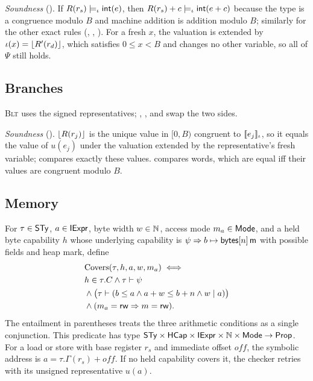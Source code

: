 \emph{Soundness} (). If $R(r_s)\models_\iota\mathsf{int}(e)$, then $R(r_s)+c\models_\iota\mathsf{int}(e+c)$ because the type is a congruence modulo $B$ and machine addition is addition modulo $B$; similarly for the other exact rules (, , ). For a fresh $x$, the valuation is extended by $\iota(x)=\lfloor R'(r_d)\rfloor$, which satisfies $0\le x<B$ and changes no other variable, so all of $\Psi$ still holds.

\subsection{Branches}
\textsc{Blt} uses the signed representatives; , , and  swap the two sides.

\emph{Soundness} (). $\lfloor R(r_j)\rfloor$ is the unique value in $[0,B)$ congruent to $[\![e_j]\!]_{\iota}$, so it equals the value of $u(e_j)$ under the valuation extended by the representative's fresh variable;  compares exactly these values.  compares words, which are equal iff their values are congruent modulo $B$.

\subsection{Memory}
\begin{definition}\label{def:access}
For $\tau\in\mathsf{STy}$, $a\in\mathsf{IExpr}$, byte width $w\in\mathbb{N}$, access mode $m_a\in\mathsf{Mode}$, and a held byte capability $h$ whose underlying capability is $\psi\Rightarrow b\mapsto\mathsf{bytes}[n]\,\mathsf{m}$ with possible fields and heap mark, define
\[
\begin{aligned}
&\mathrm{Covers}(\tau,h,a,w,m_a)\iff{}\\ &h\in\tau.C\land\tau\vdash\psi\\
&\land\big(\tau\vdash(b\le a\land a+w\le b+n\land w\mid a)\big)\\
&\land(m_a=\mathsf{rw}\Rightarrow m=\mathsf{rw}).
\end{aligned}
\]
The entailment in parentheses treats the three arithmetic conditions as a single conjunction. This predicate has type $\mathsf{STy}\times\mathsf{HCap}\times\mathsf{IExpr}\times\mathbb{N}\times\mathsf{Mode}\to\mathsf{Prop}$. For a load or store with base register $r_s$ and immediate offset $\mathit{off}$, the symbolic address is $a=\tau.\Gamma(r_s)+\mathit{off}$. If no held capability covers it, the checker retries with its unsigned representative $u(a)$.
\end{definition}


